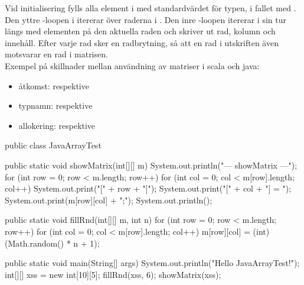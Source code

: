 \SOLUTION

\TaskSolved \what

\SubtaskSolved  Vid initialisering fylls alla element i  med standardvärdet för typen,  i fallet med . Den yttre -loopen i  itererar över raderna i . Den inre -loopen itererar i sin tur längs med elementen på den aktuella raden och skriver ut rad, kolumn och innehåll. Efter varje rad sker en radbrytning, så att en rad i utskriften även motsvarar en rad i matrisen.\\
Exempel på skillnader mellan användning av matriser i scala och java:
\begin{itemize}
\item åtkomst:  respektive 
\item typnamn:  respektive  
\item allokering:  respektive 
\end{itemize}

\SubtaskSolved  \begin{Code}[language=Java]
public class JavaArrayTest {

	public static void showMatrix(int[][] m){
		System.out.println("\n--- showMatrix ---");
		for (int row = 0; row < m.length; row++){
			for (int col = 0; col < m[row].length; col++) {
				System.out.print("[" + row + "]");
				System.out.print("[" + col + "] = ");
				System.out.print(m[row][col] + ";");
			} System.out.println();
		}
	}

	public static void fillRnd(int[][] m, int n){
		for (int row = 0; row < m.length; row++){
			for (int col = 0; col < m[row].length; col++) {
				m[row][col] = (int) (Math.random() * n + 1);
			}
		}
	}

	public static void main(String[] args) {
    System.out.println("Hello JavaArrayTest!");
		int[][] xss = new int[10][5];
		fillRnd(xss, 6);
		showMatrix(xss);
	}
}
\end{Code}

\QUESTEND




\QUESTBEGIN

